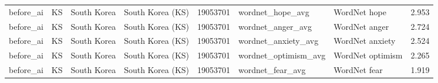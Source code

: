 \begin{tabular}{llllrllr}
before\_ai & KS & South Korea & South Korea (KS) & 19053701 & wordnet\_hope\_avg & WordNet hope & 2.953 \\
before\_ai & KS & South Korea & South Korea (KS) & 19053701 & wordnet\_anger\_avg & WordNet anger & 2.724 \\
before\_ai & KS & South Korea & South Korea (KS) & 19053701 & wordnet\_anxiety\_avg & WordNet anxiety & 2.524 \\
before\_ai & KS & South Korea & South Korea (KS) & 19053701 & wordnet\_optimism\_avg & WordNet optimism & 2.265 \\
before\_ai & KS & South Korea & South Korea (KS) & 19053701 & wordnet\_fear\_avg & WordNet fear & 1.919 \\
\bottomrule
\end{tabular}
